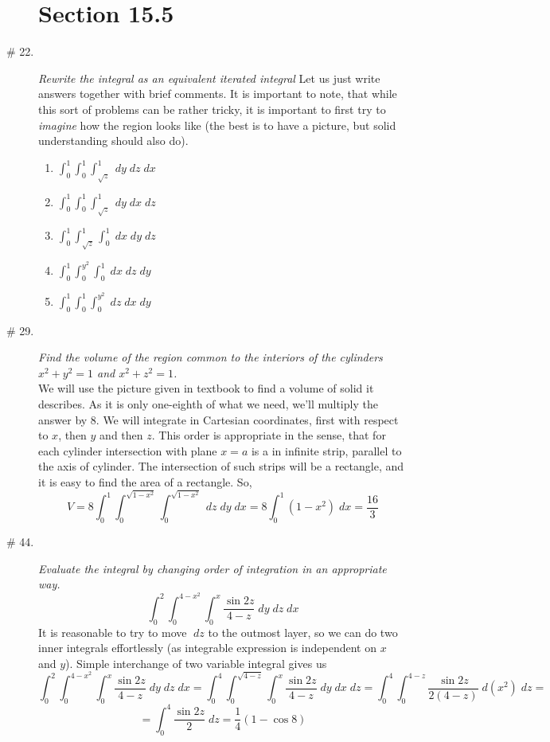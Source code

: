 \documentclass[8pt]{article} %
\newcommand{\dx}{\;dx}
\newcommand{\dy}{\;dy}
\newcommand{\dz}{\;dz}
\begin{document}
\begin{description}
\section{Section 15.5}
	\item[\# 22.]{{\it Rewrite the integral as an equivalent iterated integral}
		Let us just write answers together with brief comments. It is important to note, that while this sort of problems
		can be rather tricky, it is important to first try to {\it imagine} how the region looks like (the best is to have
		a picture, but solid understanding should also do).%
		\begin{enumerate}[label=(\bfseries\alph*)]
			\item $\int_0^1\int_0^1\int_{\sqrt{z}}^1\dy\dz\dx$
			\item $\int_0^1\int_0^1\int_{\sqrt{z}}^1\dy\dx\dz$
			\item $\int_0^1\int_{\sqrt{z}}^1\int_0^1\dx\dy\dz$
			\item $\int_0^1\int_0^{y^2}\int_0^1\dx\dz\dy$
			\item $\int_0^1\int_0^1\int_0^{y^2}\dz\dx\dy$
		\end{enumerate}
		}
	\item[\# 29.]{{\it Find the volume of the region common to the interiors of the cylinders $x^2+y^2=1$ and $x^2+z^2=1$.\\}
		We will use the picture given in textbook to find a volume of solid it describes. As it is only one-eighth of what
		we need, we'll multiply the answer by 8. We will integrate in Cartesian coordinates, first with respect to $x$,
		then $y$ and then $z$. This order is appropriate in the sense, that for each cylinder intersection with plane
		$x=a$ is a in infinite strip, parallel to the axis of cylinder. The intersection of such strips will be a rectangle,
		and it is easy to find the area of a rectangle. So,
		\[V=8\int_0^1\int_0^{\sqrt{1-x^2}}\int_0^{\sqrt{1-x^2}}\dz\dy\dx=8\int_0^1(1-x^2)\dx=\frac{16}{3}\]
		}
	\item[\# 44.]{{\it Evaluate the integral by changing order of integration in an appropriate way.}
		\[\int_0^2\int_0^{4-x^2}\int_0^x\frac{\sin 2z}{4-z}\dy\dz\dx\]
		It is reasonable to try to move $\dz$ to the outmost layer, so we can do two inner integrals effortlessly (as 
		integrable expression is independent on $x$ and $y$).
		Simple interchange of two variable integral gives us
		\[\int_0^2\int_0^{4-x^2}\int_0^x\frac{\sin 2z}{4-z}\dy\dz\dx=
		\int_0^4\int_0^{\sqrt{4-z}}\int_0^x\frac{\sin 2z}{4-z}\dy\dx\dz=\int_0^4\int_0^{4-z}\frac{\sin 2z}{2(4-z)}\;d(x^2)\dz
		=\]\[=\int_0^4\frac{\sin 2z}{2}\dz=\frac{1}{4}(1-\cos8)\]
		}

\end{description}
\end{document}
